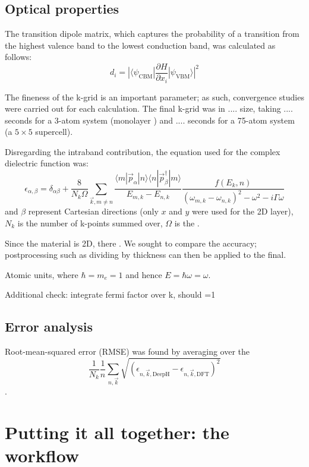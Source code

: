 \documentclass[11pt,a4paper,twoside]{report}  %
\numberwithin{equation}{section}					%
\numberwithin{figure}{section}						%
\begin{document}
\subsection{Optical properties}

The transition dipole matrix, which captures the probability of a transition from the highest  valence band to the lowest conduction band, was calculated as follows: $$d_i = |\langle\psi_{\text{CBM}}|\frac{\partial H}{\partial x_i}|\psi_{\text{VBM}}\rangle|^2$$

The fineness of the k-grid is an important parameter; as such, convergence studies were carried out for each calculation. The final k-grid was in .... size, taking .... seconds for a 3-atom system (monolayer ) and .... seconds for a 75-atom system (a $5\times 5$  supercell).

Disregarding the intraband contribution, the equation used for the complex dielectric function was: $$\epsilon_{\alpha, \beta} = \delta_{\alpha\beta} +\frac{8}{N_k\Omega}\sum_{\vec k, m\neq n} \frac{ \langle m|\vec p_\alpha|n\rangle\langle n|\vec p _\beta ^\dagger|m\rangle}{E_{m,k}-E_{n,k}}\frac{f(E_k,n)}{(\omega_{m,k}-\omega_{n,k})^2-\omega^2-i\Gamma \omega}$$ and $\beta$ represent Cartesian directions (only $x$ and $y$ were used for the 2D  layer), $N_k$ is the number of k-points summed over, $\Omega$ is the .

Since the material is 2D, there . We sought to compare the accuracy; postprocessing such as dividing by thickness can then be applied to the final.

Atomic units, where  $\hbar=m_e=1$ and hence  $E = \hbar\omega=\omega$. 

Additional check: integrate fermi factor over k, should =1

\subsection{Error analysis}

Root-mean-squared error (RMSE) was found by averaging over the $$\frac{1}{N_k}\frac1{n}\sum_{n,\vec k}\sqrt{(\epsilon_{n,\vec k, \text{DeepH}} - \epsilon_{n,\vec k, \text{DFT}})^2}$$. 



\section{Putting it all together: the workflow}
\end{document}
